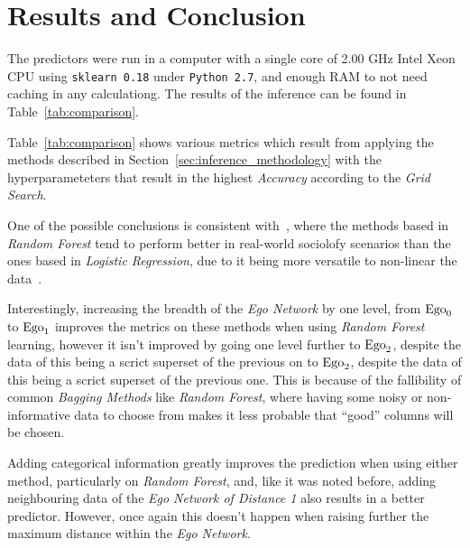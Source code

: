 \section{Results and Conclusion}
\label{sec:results}


The predictors were run in a computer with a single core of 2.00 GHz Intel Xeon CPU using \texttt{sklearn 0.18} under \texttt{Python 2.7}, and enough RAM to not need caching in any calculationg. The results of the inference can be found in Table~\ref{tab:comparison}.


Table~\ref{tab:comparison} shows various metrics which result from applying the methods described in Section~\ref{sec:inference_methodology} with the hyperparameteters that result in the highest \emph{Accuracy} according to the \emph{Grid Search}.

One of the possible conclusions is consistent with~\cite{muchlinski2016}, where the methods based in \emph{Random Forest} tend to perform better in real-world sociolofy scenarios than the ones based in \emph{Logistic Regression}, due to it being more versatile to non-linear the data~\cite{logisticvsdecision}.

Interestingly, increasing the breadth of the \emph{Ego Network} by one level, from $\operatorname{Ego}_0$ to $\operatorname{Ego}_1$ improves the metrics on these methods when using \emph{Random Forest} learning, however it isn't improved by going one level further to $\operatorname{Ego}_2$, despite the data of this being a scrict superset of the previous on to $\operatorname{Ego}_2$, despite the data of this being a scrict superset of the previous one. This is because of the fallibility of common \emph{Bagging Methods} like \emph{Random Forest}, where having some noisy or non-informative data to choose from makes it less probable that ``good'' columns will be chosen.

Adding categorical information greatly improves the prediction when using either method, particularly on \emph{Random Forest}, and, like it was noted before, adding neighbouring data of the \emph{Ego Network of Distance 1} also results in a better predictor. However, once again this doesn't happen when raising further the maximum distance within the \emph{Ego Network}.

